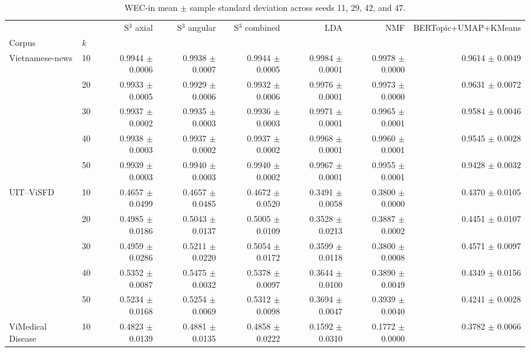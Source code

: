 \begin{table}[t]
\centering
\scriptsize
\caption{WEC-in mean $\pm$ sample standard deviation across seeds 11, 29, 42, and 47.}
\label{tab:cafebert-wec-in-sensitivity}
\begin{tabular}{llrrrrrr}
\toprule
 &  & S$^3$ axial & S$^3$ angular & S$^3$ combined & LDA & NMF & BERTopic+UMAP+KMeans \\
Corpus & $k$ &  &  &  &  &  &  \\
\midrule
\multirow[t]{5}{*}{Vietnamese-news} & 10 & 0.9944 $\pm$ 0.0006 & 0.9938 $\pm$ 0.0007 & 0.9944 $\pm$ 0.0005 & 0.9984 $\pm$ 0.0001 & 0.9978 $\pm$ 0.0000 & 0.9614 $\pm$ 0.0049 \\
 & 20 & 0.9933 $\pm$ 0.0005 & 0.9929 $\pm$ 0.0006 & 0.9932 $\pm$ 0.0006 & 0.9976 $\pm$ 0.0001 & 0.9973 $\pm$ 0.0000 & 0.9631 $\pm$ 0.0072 \\
 & 30 & 0.9937 $\pm$ 0.0002 & 0.9935 $\pm$ 0.0003 & 0.9936 $\pm$ 0.0003 & 0.9971 $\pm$ 0.0001 & 0.9965 $\pm$ 0.0001 & 0.9584 $\pm$ 0.0046 \\
 & 40 & 0.9938 $\pm$ 0.0003 & 0.9937 $\pm$ 0.0002 & 0.9937 $\pm$ 0.0002 & 0.9968 $\pm$ 0.0001 & 0.9960 $\pm$ 0.0001 & 0.9545 $\pm$ 0.0028 \\
 & 50 & 0.9939 $\pm$ 0.0003 & 0.9940 $\pm$ 0.0003 & 0.9940 $\pm$ 0.0002 & 0.9967 $\pm$ 0.0001 & 0.9955 $\pm$ 0.0001 & 0.9428 $\pm$ 0.0032 \\
\cline{1-8}
\multirow[t]{5}{*}{UIT--ViSFD} & 10 & 0.4657 $\pm$ 0.0499 & 0.4657 $\pm$ 0.0485 & 0.4672 $\pm$ 0.0520 & 0.3491 $\pm$ 0.0058 & 0.3800 $\pm$ 0.0000 & 0.4370 $\pm$ 0.0105 \\
 & 20 & 0.4985 $\pm$ 0.0186 & 0.5043 $\pm$ 0.0137 & 0.5005 $\pm$ 0.0109 & 0.3528 $\pm$ 0.0213 & 0.3887 $\pm$ 0.0002 & 0.4451 $\pm$ 0.0107 \\
 & 30 & 0.4959 $\pm$ 0.0286 & 0.5211 $\pm$ 0.0220 & 0.5054 $\pm$ 0.0172 & 0.3599 $\pm$ 0.0118 & 0.3800 $\pm$ 0.0008 & 0.4571 $\pm$ 0.0097 \\
 & 40 & 0.5352 $\pm$ 0.0087 & 0.5475 $\pm$ 0.0032 & 0.5378 $\pm$ 0.0097 & 0.3644 $\pm$ 0.0100 & 0.3890 $\pm$ 0.0049 & 0.4349 $\pm$ 0.0156 \\
 & 50 & 0.5234 $\pm$ 0.0168 & 0.5254 $\pm$ 0.0069 & 0.5312 $\pm$ 0.0098 & 0.3694 $\pm$ 0.0047 & 0.3939 $\pm$ 0.0040 & 0.4241 $\pm$ 0.0028 \\
\cline{1-8}
\multirow[t]{5}{*}{ViMedical Disease} & 10 & 0.4823 $\pm$ 0.0139 & 0.4881 $\pm$ 0.0135 & 0.4858 $\pm$ 0.0222 & 0.1592 $\pm$ 0.0310 & 0.1772 $\pm$ 0.0000 & 0.3782 $\pm$ 0.0066 \\

\end{tabular}
\end{table}
